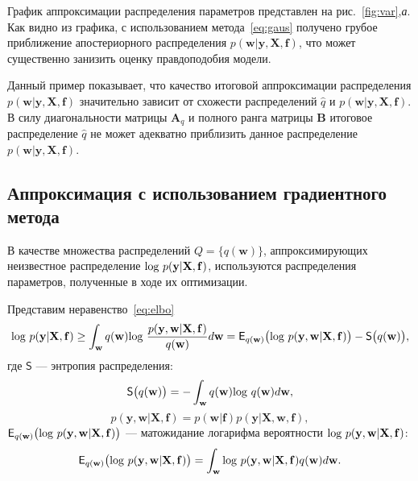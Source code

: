 График аппроксимации распределения параметров представлен на рис.~\ref{fig:var},\textit{а}. Как видно из графика, с использованием метода~\eqref{eq:gaus} получено грубое приближение апостериорного распределения $p(\mathbf{w}|\mathbf{y}, \mathbf{X}, \mathbf{f})$, что может существенно занизить оценку правдоподобия модели.



{Данный пример показывает, что качество итоговой аппроксимации распределения $p(\mathbf{w}|\mathbf{y}, \mathbf{X}, \mathbf{f})$ значительно зависит от схожести распределений $\hat{q}$ и $p(\mathbf{w}|\mathbf{y}, \mathbf{X}, \mathbf{f})$. В силу диагональности матрицы $\mathbf{A}_q$ и полного ранга матрицы $\mathbf{B}$  итоговое распределение $\hat{q}$ не может адекватно приблизить данное распределение  $p(\mathbf{w}|\mathbf{y}, \mathbf{X}, \mathbf{f})$.}



\subsection{Аппроксимация с использованием градиентного метода}
В качестве множества распределений $Q = \{q(\mathbf{w})\}$, аппроксимирующих неизвестное распределение $\textnormal{log}~p(\mathbf{y}|\mathbf{X},\mathbf{f})$, используются распределения параметров, полученные в ходе их оптимизации. 

Представим неравенство~\eqref{eq:elbo}
\begin{equation}
\label{eq:elbo_entropy}
 \textnormal{log}~p(\mathbf{y}|\mathbf{X},\mathbf{f}) \geq \int_\mathbf{w} q(\mathbf{w})\textnormal{log}~\frac{p(\mathbf{y},\mathbf{w}|\mathbf{X}, \mathbf{f})}{q(\mathbf{w})}d\mathbf{w} =  \mathsf{E}_{q(\mathbf{w)}}\bigl(\textnormal{log~}p (\mathbf{y}, \mathbf{w}|\mathbf{X}, \mathbf{f})\bigr) - \mathsf{S}\bigl({q(\mathbf{w)}}\bigr),
\end{equation}
где $\mathsf{S}$ --- энтропия распределения:
\[
\mathsf{S}\bigl({q(\mathbf{w)}}\bigr) = - \int_{\mathbf{w}} q(\mathbf{w})\textnormal{log}~q(\mathbf{w})d\mathbf{w},
\]
$$p (\mathbf{y}, \mathbf{w}|\mathbf{X}, \mathbf{f}) = p (\mathbf{w}| \mathbf{f}) p (\mathbf{y}|\mathbf{X}, \mathbf{w}, \mathbf{f}),$$
$\mathsf{E}_{q(\mathbf{w)}}\bigl(\textnormal{log~}p (\mathbf{y}, \mathbf{w}|\mathbf{X}, \mathbf{f})\bigr)$ --- матожидание логарифма вероятности $\textnormal{log~}p (\mathbf{y}, \mathbf{w}|\mathbf{X}, \mathbf{f})$:
\[
	\mathsf{E}_{q(\mathbf{w)}}\bigl(\textnormal{log~}p (\mathbf{y}, \mathbf{w}|\mathbf{X}, \mathbf{f})\bigr) = \int_\mathbf{w} \textnormal{log~}p (\mathbf{y}, \mathbf{w}|\mathbf{X}, \mathbf{f}) q(\mathbf{w}) d\mathbf{w}.
\]

